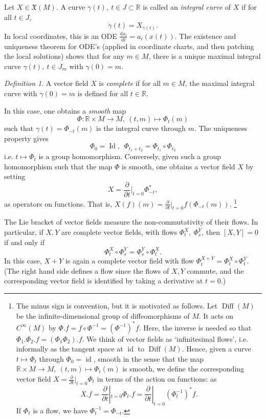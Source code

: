 \documentclass{article}
\theoremstyle{remark}
\newtheorem{definition}[theorem]{Definition}
\newcommand{\R}{\mathbb{R}}
\newcommand{\on}{\operatorname}
\renewcommand{\d}{{\mbox{d}}}
\newcommand{\f}{\frac}
\newcommand{\p}{\partial}
\newcommand{\mf}{\mathfrak}
\begin{document}
Let $X\in\mf{X}(M)$. A curve $\gamma(t),\ t\in J\subset \R$ is called an \emph{integral curve} of $X$ 
if for all $t\in J$, 
%
\[ \dot{\gamma}(t)=X_{\gamma(t)}.\]
%
In local coordinates, this is an ODE $\f{\d x_i}{\d t}=a_i(x(t))$. 
The existence and uniqueness theorem for ODE's (applied in coordinate charts, and then patching the local solutions) 
shows that for any $m\in M$, there is a unique maximal
integral curve $\gamma(t),\ t\in J_m$ with $\gamma(0)=m$. 
\begin{definition} A vector
field $X$ is \emph{complete} if for all $m\in M$, the maximal integral curve with $\gamma(0)=m$ 
is defined for all $t\in\R$. 
\end{definition}
%
In this case, one obtains a \emph{smooth} map 
%
\[ \Phi\colon \R\times M\to M,\ (t,m)\mapsto \Phi_t(m)\]
%
such that $\gamma(t)=\Phi_{-t}(m)$ is the integral curve through $m$. 
The uniqueness property gives 
%
\[ \Phi_0=\on{Id},\ \ \Phi_{t_1+t_2}=\Phi_{t_1}\circ \Phi_{t_2}\]
%
i.e. $t\mapsto \Phi_t$ is a group homomorphism. Conversely, given such a 
group homomorphism such that the map $\Phi$ is smooth, one obtains a vector field $X$ by setting 
%
\[ X=\f{\p}{\p t}|_{t=0} \Phi_{-t}^*,\]
%
as operators on functions. That is, 
$X(f)(m)=\f{\p}{\p t}|_{t=0} f(\Phi_{-t}(m))$. 
\footnote{The minus sign is convention, but it is motivated as follows. Let $\on{Diff}(M)$ be 
the infinite-dimensional group of diffeomorphisms of $M$. It acts on 
$C^\infty(M)$ by $\Phi.f=f\circ \Phi^{-1}=(\Phi^{-1})^* f$. 
Here, the inverse is needed so that $\Phi_1.\Phi_2.f=(\Phi_1\Phi_2).f$. 
We think of vector fields as `infinitesimal flows', i.e. informally 
as the tangent space at $\on{id}$ to $\on{Diff}(M)$. 
Hence, given a curve $t\mapsto \Phi_t$ through $\Phi_0=\on{id}$, 
smooth in the sense that 
the map $\R\times M\to M,\ (t,m)\mapsto \Phi_t(m)$ is smooth, we 
define the corresponding vector field $X=\f{\p}{\p t}|_{t=0}\Phi_t$ in terms of the action on functions: 
as 
\[ X.f=\f{\p}{\p t}|_{t=0} \Phi_t.f=\f{\p}{\p t}|_{t=0} (\Phi_t^{-1})^*f.
\]
If $\Phi_t$ is a flow, we have $\Phi_t^{-1}=\Phi_{-t}$.}


The Lie bracket of vector fields measure the non-commutativity of their flows. In particular, 
if $X,Y$ are complete vector fields, with flows $\Phi_t^X,\ \Phi_s^Y$, then $[X,Y]=0$ if and 
only if 
\[\Phi_t^X\circ \Phi_s^Y =\Phi_s^Y \circ \Phi_t^X.\]
% 
In this case, $X+Y$ is again a complete vector field with flow
$\Phi_t^{X+Y}=\Phi_t^X\circ \Phi_t^Y$. (The right hand side defines a
flow since the flows of $X,Y$ commute, and the corresponding vector
field is identified by taking a derivative at $t=0$.)
\end{document}
